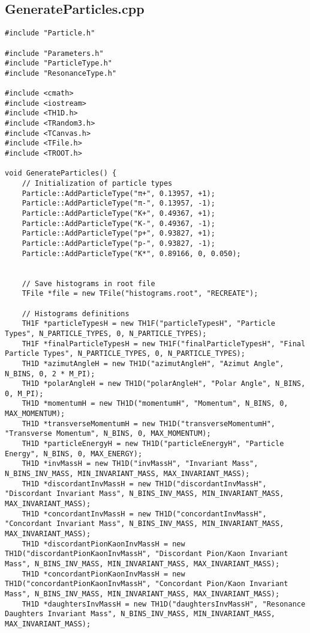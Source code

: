 \documentclass{article}
\begin{document}
\subsection*{GenerateParticles.cpp}
\begin{verbatim}
#include "Particle.h"

#include "Parameters.h"
#include "ParticleType.h"
#include "ResonanceType.h"

#include <cmath>
#include <iostream>
#include <TH1D.h>
#include <TRandom3.h>
#include <TCanvas.h>
#include <TFile.h>
#include <TROOT.h>

void GenerateParticles() {
    // Initialization of particle types
    Particle::AddParticleType("π+", 0.13957, +1);
    Particle::AddParticleType("π-", 0.13957, -1);
    Particle::AddParticleType("K+", 0.49367, +1);
    Particle::AddParticleType("K-", 0.49367, -1);
    Particle::AddParticleType("p+", 0.93827, +1);
    Particle::AddParticleType("p-", 0.93827, -1);
    Particle::AddParticleType("K*", 0.89166, 0, 0.050);

    
    // Save histograms in root file
    TFile *file = new TFile("histograms.root", "RECREATE");

    // Histograms definitions
    TH1F *particleTypesH = new TH1F("particleTypesH", "Particle Types", N_PARTICLE_TYPES, 0, N_PARTICLE_TYPES);
    TH1F *finalParticleTypesH = new TH1F("finalParticleTypesH", "Final Particle Types", N_PARTICLE_TYPES, 0, N_PARTICLE_TYPES);
    TH1D *azimutAngleH = new TH1D("azimutAngleH", "Azimut Angle", N_BINS, 0, 2 * M_PI);
    TH1D *polarAngleH = new TH1D("polarAngleH", "Polar Angle", N_BINS, 0, M_PI);
    TH1D *momentumH = new TH1D("momentumH", "Momentum", N_BINS, 0, MAX_MOMENTUM);
    TH1D *transverseMomentumH = new TH1D("transverseMomentumH", "Transverse Momentum", N_BINS, 0, MAX_MOMENTUM);
    TH1D *particleEnergyH = new TH1D("particleEnergyH", "Particle Energy", N_BINS, 0, MAX_ENERGY);
    TH1D *invMassH = new TH1D("invMassH", "Invariant Mass", N_BINS_INV_MASS, MIN_INVARIANT_MASS, MAX_INVARIANT_MASS);
    TH1D *discordantInvMassH = new TH1D("discordantInvMassH", "Discordant Invariant Mass", N_BINS_INV_MASS, MIN_INVARIANT_MASS, MAX_INVARIANT_MASS);
    TH1D *concordantInvMassH = new TH1D("concordantInvMassH", "Concordant Invariant Mass", N_BINS_INV_MASS, MIN_INVARIANT_MASS, MAX_INVARIANT_MASS);
    TH1D *discordantPionKaonInvMassH = new TH1D("discordantPionKaonInvMassH", "Discordant Pion/Kaon Invariant Mass", N_BINS_INV_MASS, MIN_INVARIANT_MASS, MAX_INVARIANT_MASS);
    TH1D *concordantPionKaonInvMassH = new TH1D("concordantPionKaonInvMassH", "Concordant Pion/Kaon Invariant Mass", N_BINS_INV_MASS, MIN_INVARIANT_MASS, MAX_INVARIANT_MASS);
    TH1D *daughtersInvMassH = new TH1D("daughtersInvMassH", "Resonance Daughters Invariant Mass", N_BINS_INV_MASS, MIN_INVARIANT_MASS, MAX_INVARIANT_MASS);


\end{verbatim}
\end{document}
